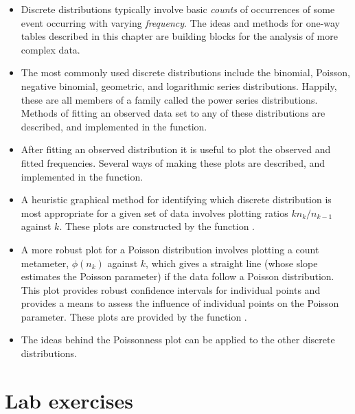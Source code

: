 \documentclass[10pt,krantz2]{krantz}\usepackage[]{graphicx}\usepackage[]{color}
\begin{document}
\begin{itemize}
\item Discrete distributions typically involve basic \emph{counts} of occurrences
of some event occurring with varying \emph{frequency}. The ideas and methods
for one-way tables described in this chapter are building blocks for
the analysis of more complex data.

\item The most commonly used discrete distributions include the binomial,
Poisson, negative binomial, geometric, and logarithmic series distributions.
Happily, these are all members of a family called the
power series distributions.
Methods of fitting an observed data set to any of these distributions are
described, and implemented in the  function.

\item After fitting an observed distribution it is useful to plot the observed
and fitted frequencies.
Several ways of making these plots are described, and implemented in the
 function.

\item A heuristic graphical method for identifying which discrete distribution is most
appropriate for a given set of data involves plotting ratios
$k n_k / n_{k-1}$ against $k$.
These plots are constructed by the function .

\item A more robust plot for a Poisson distribution involves plotting
a count metameter, $\phi ( n_k ) $ against $k$, which
gives a straight line (whose slope estimates the Poisson parameter)
if the data follow a Poisson distribution.
This plot provides robust confidence intervals for individual points
and provides a means to assess the influence of individual points
on the Poisson parameter.
These plots are provided by the function .

\item The ideas behind the Poissonness plot can be applied to the other
discrete distributions.
\end{itemize}



\section{Lab exercises}\label{sec:ch03-labs}
\end{document}
